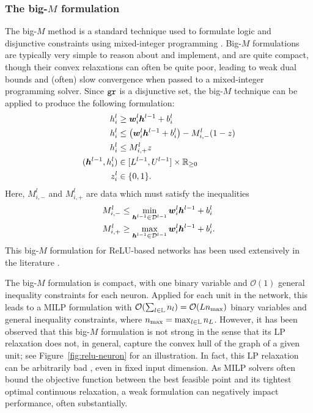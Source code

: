 \subsubsection{The big-$M$ formulation} 

The big-$M$ method is a standard technique used to formulate logic and disjunctive constraints using mixed-integer programming \citep{bonami2015mathematical,vielma2015mixed}. Big-$M$ formulations are typically very simple to reason about and implement, and are quite compact, though their convex relaxations can often be quite poor, leading to weak dual bounds and (often) slow convergence when passed to a mixed-integer programming solver. Since $\texttt{gr}$ is a disjunctive set, the big-$M$ technique can be applied to produce the following formulation:
\begin{subequations} \label{eqn:relu-big-m}
\begin{align}
    h^l_i &\geq {\bm{w}}^l_i {\bm{h}}^{l-1} + b^l_i \label{eqn:relu-big-m-1} \\
    h^l_i &\leq \left({\bm{w}}^l_i {\bm{h}}^{l-1} + b^l_i\right) - M^{l}_{i,-}(1-z) \\
    h^l_i &\leq M^{l}_{i,+}z \\
    ({\bm{h}}^{l-1},h^l_i) &\in [L^{l-1},U^{l-1}] \times \mathbb{R}_{\geq 0} \label{eqn:relu-big-m-4} \\
    z^l_i &\in \{0,1\}. \label{eqn:relu-big-m-5}
\end{align}
\end{subequations}
Here, $M^l_{i,-}$ and $M^l_{i,+}$ are data which must satisfy the inequalities
\begin{align*}
    M^l_{i,-} &\leq \min_{{\bm{h}}^{l-1} \in \mathcal{D}^{l-1}} {\bm{w}}^l_i {\bm{h}}^{l-1} + b^l_i \\
    M^l_{i,+} &\geq \max_{{\bm{h}}^{l-1} \in \mathcal{D}^{l-1}} {\bm{w}}^l_i {\bm{h}}^{l-1} + b^l_i.
\end{align*}
This big-$M$ formulation for ReLU-based networks has been used extensively in the literature \citep{bunel2018unified,Cheng2017,DuttaMIP,FischettiMIP,kumar2019equivalent,LomuscioMIP,serra2020empirical,serra2018bounding,tjeng2017evaluating,xiao2018training}.

The big-$M$ formulation is compact, with one binary variable and $\mathcal{O}(1)$ general inequality constraints for each neuron. 
Applied for each unit in the network, this leads to a MILP formulation with $\mathcal{O}(\sum_{l \in {\mathbb{L}}} n_l) = \mathcal{O}(Ln_{\max} )$ binary variables and general inequality constraints, where $n_{\max} = \max_{l \in {\mathbb{L}}} n_L$. However, it has been observed \citep{anderson2019strong,anderson2020strong} that this big-$M$ formulation is not strong in the sense that its LP relaxation does not, in general, capture the convex hull of the graph of a given unit; see Figure~\ref{fig:relu-neuron} for an illustration. In fact, this LP relaxation can be arbitrarily bad \citep[Example 2]{anderson2019strong}, even in fixed input dimension.
As MILP solvers often bound the objective function between the best feasible point and its tightest optimal continuous relaxation, a weak formulation can negatively impact performance, often substantially. 

